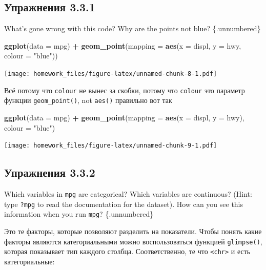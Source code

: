 \documentclass[]{book}
\newenvironment{Shaded}{\begin{snugshade}}{\end{snugshade}}
\newcommand{\KeywordTok}[1]{\textcolor[rgb]{0.13,0.29,0.53}{\textbf{#1}}}
\newcommand{\DataTypeTok}[1]{\textcolor[rgb]{0.13,0.29,0.53}{#1}}
\newcommand{\StringTok}[1]{\textcolor[rgb]{0.31,0.60,0.02}{#1}}
\newcommand{\OperatorTok}[1]{\textcolor[rgb]{0.81,0.36,0.00}{\textbf{#1}}}
\newcommand{\NormalTok}[1]{#1}
\begin{document}
\subsection*{Упражнения 3.3.1}\label{-3.3.1}

What's gone wrong with this code? Why are the points not blue?
\{.unnumbered\}

\begin{Shaded}
\begin{Highlighting}[]
\KeywordTok{ggplot}\NormalTok{(}\DataTypeTok{data =}\NormalTok{ mpg) }\OperatorTok{+}
\StringTok{  }\KeywordTok{geom_point}\NormalTok{(}\DataTypeTok{mapping =} \KeywordTok{aes}\NormalTok{(}\DataTypeTok{x =}\NormalTok{ displ, }\DataTypeTok{y =}\NormalTok{ hwy, }\DataTypeTok{colour =} \StringTok{"blue"}\NormalTok{))}
\end{Highlighting}
\end{Shaded}

\texttt{[image: homework\_files/figure-latex/unnamed-chunk-8-1.pdf]}

Всё потому что \texttt{colour} не вынес за скобки, потому что
\texttt{colour} это параметр функции \texttt{geom\_point()}, not
\texttt{aes()} правильно вот так

\begin{Shaded}
\begin{Highlighting}[]
\KeywordTok{ggplot}\NormalTok{(}\DataTypeTok{data =}\NormalTok{ mpg) }\OperatorTok{+}
\StringTok{  }\KeywordTok{geom_point}\NormalTok{(}\DataTypeTok{mapping =} \KeywordTok{aes}\NormalTok{(}\DataTypeTok{x =}\NormalTok{ displ, }\DataTypeTok{y =}\NormalTok{ hwy), }\DataTypeTok{colour =} \StringTok{"blue"}\NormalTok{)}
\end{Highlighting}
\end{Shaded}

\texttt{[image: homework\_files/figure-latex/unnamed-chunk-9-1.pdf]}

\subsection*{Упражнения 3.3.2}\label{-3.3.2}

Which variables in \texttt{mpg} are categorical? Which variables are
continuous? (Hint: type \texttt{?mpg} to read the documentation for the
dataset). How can you see this information when you run \texttt{mpg}?
\{.unnumbered\}

Это те факторы, которые позволяют разделить на показатели. Чтобы понять
какие факторы являются категориальными можно воспользоваться функцией
\texttt{glimpse()}, которая показывает тип каждого столбца.
Соответственно, те что \texttt{\textless{}chr\textgreater{}} и есть
категориальные:
\end{document}
